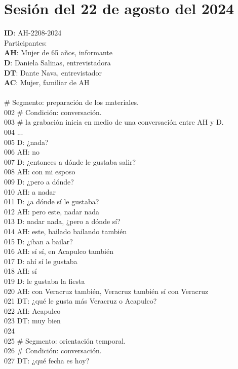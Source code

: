 \section{Sesión del 22 de agosto del 2024}
\noindent
\textbf{ID}: AH-2208-2024\\
Participantes:\\
\textbf{AH}: Mujer de 65 años, informante\\
\textbf{D}: Daniela Salinas, entrevistadora\\
\textbf{DT}: Dante Nava, entrevistador\\
\textbf{AC}: Mujer, familiar de AH\\
\\
 \# Segmento: preparación de los materiales.\\
002 \# Condición: conversación.\\
003 \# la grabación inicia en medio de una conversación entre AH y D.\\
004 ...\\
005 D: ¿nada?\\
006 AH: no\\
007 D: ¿entonces a dónde le gustaba salir?\\
008 AH: con mi esposo\\
009 D: ¿pero a dónde?\\
010 AH: a nadar\\
011 D: ¿a dónde sí le gustaba?\\
012 AH: pero este, nadar nada\\
013 D: nadar nada, ¿pero a dónde sí?\\
014 AH: este, bailado bailando también\\
015 D: ¿iban a bailar?\\
016 AH: sí sí, en Acapulco también\\
017 D: ahí sí le gustaba\\
018 AH: sí\\
019 D: le gustaba la fiesta\\
020 AH: con Veracruz también, Veracruz también sí con Veracruz\\
021 DT: ¿qué le gusta más Veracruz o Acapulco?\\
022 AH: Acapulco\\
023 DT: muy bien\\
024 \\
025 \# Segmento: orientación temporal.\\
026 \# Condición: conversación.\\
027 DT: ¿qué fecha es hoy?\\
